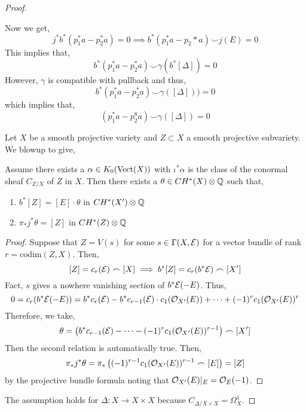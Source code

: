 \documentclass[12pt]{article}
\begin{document}
\begin{proof}
\begin{center}
\end{center}
Now we get,
\[ j^* b^* (p_1^* a- p_2^* a) = 0 \implies b^*(p_1^* a - p_2*a) \smile j(E) = 0 \]
This implies that,
\[ b^* (p_1^* a - p_2^* a) \smile \gamma(b^*[\Delta]) = 0 \]
However, $\gamma$ is compatible with pullback and thus,
\[ b^* (p_1^* a - p_2^* a) \smile \gamma([\Delta])) = 0 \]
which implies that,
\[ (p_1^* a - p_2^8a) \smile \gamma([\Delta]) = 0 \]
\begin{lemma}
Let $X$ be a smooth projective variety and $Z \subset X$ a smooth projective subvariety. We blowup to give,
\begin{center}
\end{center}
Assume there exists a $\alpha \in K_0(\mathrm{Vect}(X))$ with $\iota^* \alpha$ is the class of the conormal sheaf $C_{Z / X}$ of $Z$ in $X$. Then there exists a $\theta \in CH^*(X) \otimes \mathbb{Q}$ such that,
\begin{enumerate}
\item $b^* [Z] = [E] \cdot \theta$ in $CH^*(X') \otimes \mathbb{Q}$
\item $\pi_* j^* \theta = [Z]$ in $CH^*(Z) \otimes \mathbb{Q}$
\end{enumerate}
\end{lemma}

\newcommand{\codim}{\mathrm{codim}}

\begin{proof}
Suppose that $Z = V(s)$ for some $s \in \Gamma(X, \mathcal{E})$ for a vector bundle of rank $r = \codim(Z,X)$. Then,
\[ [Z] = c_r(\mathcal{E}) \frown [X] \implies b^*[Z] = c_r(b^* \mathcal{E}) \frown [X'] \]
Fact, $s$ gives a nowhere vanishing section of $b^* \mathcal{E}(-E)$. Thus,
\[ 0 = c_r(b^* \mathcal{E}(-E)) = b^* c_r(\mathcal{E}) - b^* c_{r-1}(\mathcal{E}) \cdot c_1(\mathcal{O}_{X'}(E)) + \cdots + (-1)^r c_1(\mathcal{O}_{X'}(E))^r \]
Therefore, we take,
\[ \theta = \left( b^* c_{r-1}(\mathcal{E}) - \cdots - (-1)^r c_1(\mathcal{O}_{X'}(E))^{r- 1} \right) \frown [X'] \]
Then the second relation is automatically true. Then,
\[ \pi_* j^* \theta = \pi_* \left( (-1)^{r-1} c_1(\mathcal{O}_{X'}(E))^{r - 1} \frown [E] \right) = [Z] \]
by the projective bundle formula noting that $\mathcal{O}_{X'}(E) |_E   = \mathcal{O}_{E}(-1)$. 
\end{proof}

The assumption holds for $\Delta : X \to X \times X$ because $C_{\Delta / X \times X} = \Omega^1_X$. 

\end{proof}
\end{document}
